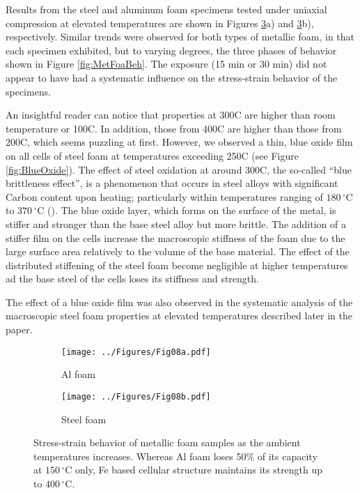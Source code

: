\documentclass[review]{elsarticle}
\begin{document}
Results from the steel and aluminum foam specimens tested under uniaxial compression at elevated temperatures are shown in Figures \ref{fig:FoamStrStr}a) and \ref{fig:FoamStrStr}b), respectively. Similar trends were observed for both types of metallic foam, in that each specimen exhibited, but to varying degrees, the three phases of behavior shown in Figure \ref{fig:MetFoaBeh}. The exposure (15 min or 30 min) did not appear to have had a systematic influence on the stress-strain behavior of the specimens.

An insightful reader can notice that properties at 300C are higher than room temperature or 100C. In addition, those from 400C are higher than those from 200C, which seems puzzling at first. However, we observed a thin, blue oxide film on all cells of steel foam at temperatures exceeding 250C (see Figure \ref{fig:BlueOxide}). The effect of steel oxidation at around 300C, the so-called “blue brittleness effect”, is a phenomenon that occurs in steel alloys with significant Carbon content upon heating; particularly within temperatures ranging of $180\,^{\circ}\mathrm{C}$ to $370\,^{\circ}\mathrm{C}$ (\cite{XiongandLiew2016}). The blue oxide layer, which forms on the surface of the metal, is stiffer and stronger than the base steel alloy but more brittle. The addition of a stiffer film on the cells increase the macroscopic stiffness of the foam due to the large surface area relatively to the volume of the base material. The effect of the distributed stiffening of the steel foam become negligible at higher temperatures ad the base steel of the cells loses its stiffness and strength.

 The effect of a blue oxide film was also observed in the systematic analysis of the macroscopic steel foam properties at elevated temperatures described later in the paper.

\begin{figure}
	\centering
	\begin{subfigure}{.5\textwidth}
		\centering
		\texttt{[image: ../Figures/Fig08a.pdf]}
		\caption{Al foam}
		\label{fig8:sub1}
	\end{subfigure}%
	\begin{subfigure}{.5\textwidth}
		\centering
		\texttt{[image: ../Figures/Fig08b.pdf]}
		\caption{Steel foam}
		\label{fig8:sub2}
	\end{subfigure}
	\caption{Stress-strain behavior of metallic foam samples as the ambient temperatures increases. Whereas Al foam loses 50\% of its capacity at $150\,^{\circ}\mathrm{C}$ only, Fe based cellular structure maintains its strength up to  $400\,^{\circ}\mathrm{C}$.}
	\label{fig:FoamStrStr}
\end{figure}
\end{document}
